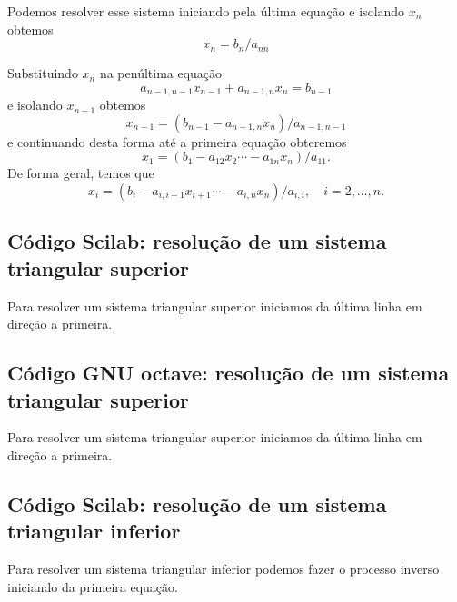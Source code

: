 Podemos resolver esse sistema iniciando pela última equação e isolando $x_n$ obtemos
\begin{equation}
 x_n = b_n/a_{nn}
\end{equation}

Substituindo $x_n$ na penúltima equação
\begin{equation}
 a_{n-1,n-1}x_{n-1}+a_{n-1,n}x_n = b_{n-1}
\end{equation}
e isolando $x_{n-1}$ obtemos
\begin{equation}
 x_{n-1} = (b_{n-1}-a_{n-1,n}x_n)/a_{n-1,n-1}
\end{equation}
e continuando desta forma até a primeira equação obteremos
\begin{equation}
 x_{1} = (b_{1}-a_{12}x_2 \cdots -a_{1n}x_n)/a_{11}.
\end{equation}
De forma geral, temos que
\begin{equation}
 x_{i} = (b_{i}-a_{i,i+1}x_{i+1} \cdots -a_{i,n}x_n)/a_{i,i}, \quad i=2,\dots,n.
\end{equation}

\ifisscilab
\subsection{Código Scilab: resolução de um sistema triangular superior}

Para resolver um sistema triangular superior iniciamos da última linha em direção a primeira.


\fi

\ifisoctave
\subsection{Código GNU octave: resolução de um sistema triangular superior}

Para resolver um sistema triangular superior iniciamos da última linha em direção a primeira.


\fi

\ifisscilab
\subsection{Código Scilab: resolução de um sistema triangular inferior}
Para resolver um sistema triangular inferior podemos fazer o processo inverso iniciando da primeira equação.

